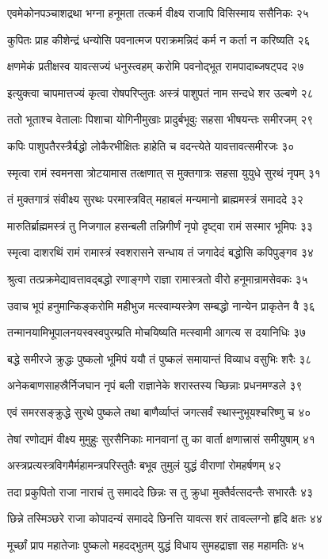 एवमेकोनपञ्चाशद्रथा भग्ना हनूमता
तत्कर्म वीक्ष्य राजापि विसिस्माय ससैनिकः २५

कुपितः प्राह कीशेन्द्रं धन्योसि पवनात्मज
पराक्रमन्निदं कर्म न कर्ता न करिष्यति २६

क्षणमेकं प्रतीक्षस्व यावत्सज्यं धनुस्त्वहम्
करोमि पवनोद्भूत रामपादाब्जषट्पद २७

इत्युक्त्वा चापमात्तज्यं कृत्वा रोषपरिप्लुतः
अस्त्रं पाशुपतं नाम सन्दधे शर उल्बणे २८

ततो भूताश्च वेतालाः पिशाचा योगिनीमुखाः
प्रादुर्बभूवुः सहसा भीषयन्तः समीरजम् २९

कपिः पाशुपतैरस्त्रैर्बद्धो लोकैरभीक्षितः
हाहेति च वदन्त्येते यावत्तावत्समीरजः ३०

स्मृत्वा रामं स्वमनसा त्रोटयामास तत्क्षणात्
स मुक्तगात्रः सहसा युयुधे सुरथं नृपम् ३१

तं मुक्तगात्रं संवीक्ष्य सुरथः परमास्त्रवित्
महाबलं मन्यमानो ब्राह्ममस्त्रं समाददे ३२

मारुतिर्ब्राह्ममस्त्रं तु निजगाल हसन्बली
तन्निगीर्णं नृपो दृष्ट्वा रामं सस्मार भूमिपः ३३

स्मृत्वा दाशरथिं रामं रामास्त्रं स्वशरासने
सन्धाय तं जगादेदं बद्धोसि कपिपुङ्गव ३४

श्रुत्वा तत्प्रक्रमेद्यावत्तावद्बद्धो रणाङ्गणे
राज्ञा रामास्त्रतो वीरो हनूमान्रामसेवकः ३५

उवाच भूपं हनुमान्किङ्करोमि महीभुज
मत्स्वाम्यस्त्रेण सम्बद्धो नान्येन प्राकृतेन वै ३६

तन्मानयामिभूपालनयस्वस्वपुरम्प्रति
मोचयिष्यति मत्स्वामी आगत्य स दयानिधिः ३७

बद्धे समीरजे क्रुद्धः पुष्कलो भूमिपं ययौ
तं पुष्कलं समायान्तं विव्याध वसुभिः शरैः ३८

अनेकबाणसाहस्रैर्निजघान नृपं बली
राज्ञानेके शरास्तस्य च्छिन्नाः प्रधनमण्डले ३९

एवं समरसङ्क्रुद्धे सुरथे पुष्कले तथा
बाणैर्व्याप्तं जगत्सर्वं स्थास्नुभूयश्चरिष्णु च ४०

तेषां रणोद्यमं वीक्ष्य मुमुहुः सुरसैनिकाः
मानवानां तु का वार्ता क्षणात्त्रासं समीयुषाम् ४१

अस्त्रप्रत्यस्त्रविगमैर्महामन्त्रपरिस्तुतैः
बभूव तुमुलं युद्धं वीराणां रोमहर्षणम् ४२

तदा प्रकुपितो राजा नाराचं तु समाददे
छिन्नः स तु क्रुधा मुक्तैर्वत्सदन्तैः सभारतैः ४३

छिन्ने तस्मिञ्छरे राजा कोपादन्यं समाददे
छिनत्ति यावत्स शरं तावल्लग्नो हृदि क्षतः ४४

मूर्च्छां प्राप महातेजाः पुष्कलो महदद्भुतम्
युद्धं विधाय सुमहद्राज्ञा सह महामतिः ४५

